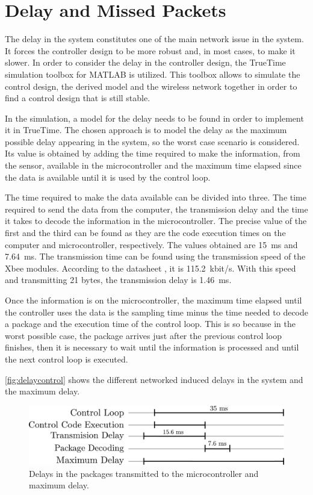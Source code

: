 \section{Delay and Missed Packets}
The delay in the system constitutes one of the main network issue in the system. It forces the controller design to be more robust and, in most cases, to make it slower. In order to consider the delay in the controller design, the TrueTime simulation toolbox for MATLAB is utilized. This toolbox allows to simulate the control design, the derived model and the wireless network together in order to find a control design that is still stable.

In the simulation, a model for the delay needs to be found in order to implement it in TrueTime. The chosen approach is to model the delay as the maximum possible delay appearing in the system, so the worst case scenario is considered. Its value is obtained by adding the time required to make the information, from the sensor, available in the microcontroller and the maximum time elapsed since the data is available until it is used by the control loop. 

The time required to make the data available can be divided into three. The time required to send the data from the computer, the transmission delay and the time it takes to decode the information in the microcontroller. The precise value of the first and the third can be found as they are the code execution times on the computer and microcontroller, respectively. The values obtained are \SI{15}{ms} and \SI{7.64}{ms}. The transmission time can be found using the transmission speed of the Xbee modules. According to the datasheet \cite{XBee}, it is \SI{115.2}{kbit/s}. With this speed and transmitting 21 bytes, the transmission delay is \SI{1.46}{ms}.

Once the information is on the microcontroller, the maximum time elapsed until the controller uses the data is the sampling time minus the time needed to decode a package and the execution time of the control loop. This is so because in the worst possible case, the package arrives just after the previous control loop finishes, then it is necessary to wait until the information is processed and until the next control loop is executed. 

\autoref{fig:delaycontrol} shows the different networked induced delays in the system and the maximum delay. 
\begin{figure}[H]
	\centering
	\includegraphics[width=.6\textwidth]{figures/maxDelay.pdf}
	\caption{Delays in the packages transmitted to the microcontroller and maximum delay.}
	\label{fig:delaycontrol}
\end{figure}


